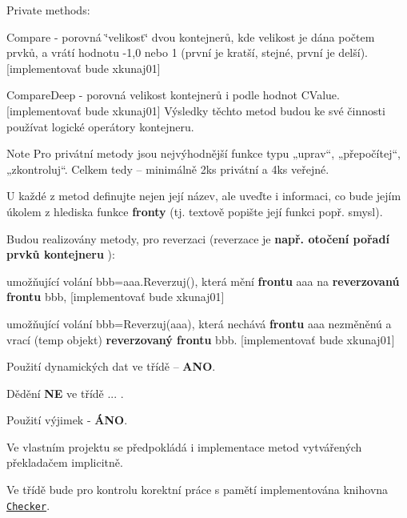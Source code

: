 \begin{DoxyEnumerate}
Private methods\+:
\begin{DoxyItemize}
\item {\ttfamily Compare} -\/ porovná \char`\"{}velikost\char`\"{} dvou kontejnerů, kde velikost je dána počtem prvků, a vrátí hodnotu -\/1,0 nebo 1 (první je kratší, stejné, první je delší). \mbox{[}implementovať bude xkunaj01\mbox{]}
\item {\ttfamily Compare\+Deep} -\/ porovná velikost kontejnerů i podle hodnot {\ttfamily C\+Value}. \mbox{[}implementovať bude xkunaj01\mbox{]} Výsledky těchto metod budou ke své činnosti používat logické operátory kontejneru. \begin{DoxyNote}{Note}
Pro privátní metody jsou nejvýhodnější funkce typu „uprav“, „přepočítej“, „zkontroluj“. Celkem tedy – minimálně 2ks privátní a 4ks veřejné. 

U každé z metod definujte nejen její název, ale uveďte i informaci, co bude jejím úkolem z hlediska funkce {\bfseries fronty} (tj. textově popište její funkci popř. smysl).
\end{DoxyNote}

\end{DoxyItemize}
\item Budou realizovány metody, pro reverzaci (reverzace je {\bfseries např. otočení pořadí prvků kontejneru} )\+:
\begin{DoxyItemize}
\item umožňující volání {\ttfamily bbb=aaa.\+Reverzuj()}, která mění {\bfseries frontu} {\ttfamily aaa} na {\bfseries reverzovanú frontu} {\ttfamily bbb}, \mbox{[}implementovať bude xkunaj01\mbox{]}
\item umožňující volání {\ttfamily bbb=Reverzuj(aaa)}, která nechává {\bfseries frontu} {\ttfamily aaa} nezměněnú a vrací (temp objekt) {\bfseries reverzovaný frontu} {\ttfamily bbb}. \mbox{[}implementovať bude xkunaj01\mbox{]}
\end{DoxyItemize}
\item Použití dynamických dat ve třídě – {\bfseries A\+NO}.
\item Dědění {\bfseries NE} ve třídě ... .
\item Použití výjimek -\/ {\bfseries Á\+NO}.
\item Ve vlastním projektu se předpokládá i implementace metod vytvářených překladačem implicitně.
\item Ve třídě bude pro kontrolu korektní práce s pamětí implementována knihovna \href{http://www.uamt.feec.vutbr.cz/~petyovsky/projects/checker/checker.zip}{\tt Checker}.
\end{DoxyEnumerate}

